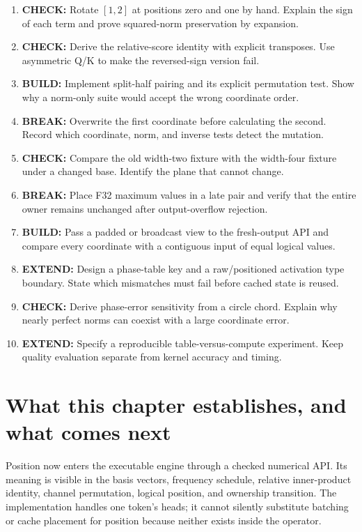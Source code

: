 \begin{enumerate}
\def\labelenumi{\arabic{enumi}.}
\tightlist
\item
  \textbf{CHECK:} Rotate \([1,2]\) at positions zero and one by hand.
  Explain the sign of each term and prove squared-norm preservation by
  expansion.
\item
  \textbf{CHECK:} Derive the relative-score identity with explicit
  transposes. Use asymmetric Q/K to make the reversed-sign version fail.
\item
  \textbf{BUILD:} Implement split-half pairing and its explicit
  permutation test. Show why a norm-only suite would accept the wrong
  coordinate order.
\item
  \textbf{BREAK:} Overwrite the first coordinate before calculating the
  second. Record which coordinate, norm, and inverse tests detect the
  mutation.
\item
  \textbf{CHECK:} Compare the old width-two fixture with the width-four
  fixture under a changed base. Identify the plane that cannot change.
\item
  \textbf{BREAK:} Place F32 maximum values in a late pair and verify
  that the entire owner remains unchanged after output-overflow
  rejection.
\item
  \textbf{BUILD:} Pass a padded or broadcast view to the fresh-output
  API and compare every coordinate with a contiguous input of equal
  logical values.
\item
  \textbf{EXTEND:} Design a phase-table key and a raw/positioned
  activation type boundary. State which mismatches must fail before
  cached state is reused.
\item
  \textbf{CHECK:} Derive phase-error sensitivity from a circle chord.
  Explain why nearly perfect norms can coexist with a large coordinate
  error.
\item
  \textbf{EXTEND:} Specify a reproducible table-versus-compute
  experiment. Keep quality evaluation separate from kernel accuracy and
  timing.
\end{enumerate}

\section{What this chapter establishes, and what comes
next}\label{what-this-chapter-establishes-and-what-comes-next}

Position now enters the executable engine through a checked numerical
API. Its meaning is visible in the basis vectors, frequency schedule,
relative inner-product identity, channel permutation, logical position,
and ownership transition. The implementation handles one token's heads;
it cannot silently substitute batching or cache placement for position
because neither exists inside the operator.

